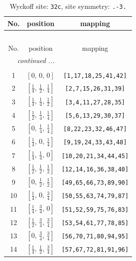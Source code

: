 \documentclass[fleqn,8pt]{jsarticle}
\begin{document}
\begin{longtable}{ccc}
\caption{Wyckoff site: {\tt 32c}, site symmetry: {\tt .-3.}}
 \\
 \hline \hline
No. & position & mapping \\ \hline \endfirsthead

\multicolumn{2}{l}{\tablename\ \thetable{}} \\
 \hline \hline
No. & position & mapping \\ \hline \endhead

 \hline \hline
\multicolumn{2}{r}{\footnotesize\it continued ...} \\ \endfoot

 \hline \hline
\multicolumn{2}{r}{} \\ \endlastfoot

1 & $\left[ 0,\, 0,\, 0 \right]$ & {\tt [1,17,18,25,41,42]} \\ \hline
2 & $\left[ \frac{1}{4},\, \frac{1}{2},\, \frac{1}{4} \right]$ & {\tt [2,7,15,26,31,39]} \\ \hline
3 & $\left[ \frac{1}{4},\, \frac{1}{4},\, \frac{1}{2} \right]$ & {\tt [3,4,11,27,28,35]} \\ \hline
4 & $\left[ \frac{1}{2},\, \frac{1}{4},\, \frac{1}{4} \right]$ & {\tt [5,6,13,29,30,37]} \\ \hline
5 & $\left[ 0,\, \frac{1}{4},\, \frac{1}{4} \right]$ & {\tt [8,22,23,32,46,47]} \\ \hline
6 & $\left[ \frac{1}{4},\, 0,\, \frac{1}{4} \right]$ & {\tt [9,19,24,33,43,48]} \\ \hline
7 & $\left[ \frac{1}{4},\, \frac{1}{4},\, 0 \right]$ & {\tt [10,20,21,34,44,45]} \\ \hline
8 & $\left[ \frac{1}{2},\, \frac{1}{2},\, \frac{1}{2} \right]$ & {\tt [12,14,16,36,38,40]} \\ \hline
9 & $\left[ 0,\, \frac{1}{2},\, \frac{1}{2} \right]$ & {\tt [49,65,66,73,89,90]} \\ \hline
10 & $\left[ \frac{1}{4},\, 0,\, \frac{3}{4} \right]$ & {\tt [50,55,63,74,79,87]} \\ \hline
11 & $\left[ \frac{1}{4},\, \frac{3}{4},\, 0 \right]$ & {\tt [51,52,59,75,76,83]} \\ \hline
12 & $\left[ \frac{1}{2},\, \frac{3}{4},\, \frac{3}{4} \right]$ & {\tt [53,54,61,77,78,85]} \\ \hline
13 & $\left[ 0,\, \frac{3}{4},\, \frac{3}{4} \right]$ & {\tt [56,70,71,80,94,95]} \\ \hline
14 & $\left[ \frac{1}{4},\, \frac{1}{2},\, \frac{3}{4} \right]$ & {\tt [57,67,72,81,91,96]} \\ \hline

\end{longtable}
\end{document}
